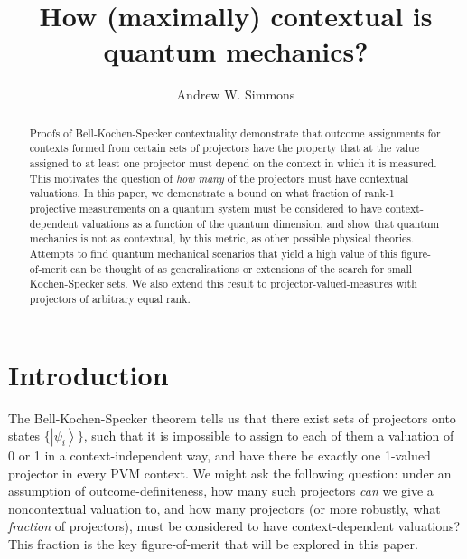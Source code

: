 \documentclass{amsart}
\theoremstyle{definition}
\newcommand{\ket}[1]{{\left\vert{#1}\right\rangle}}
\begin{document}
\title{How (maximally) contextual is quantum mechanics?}
\author{Andrew W. Simmons}
\address{Department of Physics, Imperial College London, SW7 2AZ.}
\begin{abstract}
Proofs of Bell-Kochen-Specker contextuality demonstrate that outcome assignments for contexts formed from certain sets of projectors have the property that at the value assigned to at least one projector must depend on the context in which it is measured. This motivates the question of \emph{how many} of the projectors must have contextual valuations. In this paper, we demonstrate a bound on what fraction of rank-1 projective measurements on a quantum system must be considered to have context-dependent valuations as a function of the quantum dimension, and show that quantum mechanics is not as contextual, by this metric, as other possible physical theories. Attempts to find quantum mechanical scenarios that yield a high value of this figure-of-merit can be thought of as generalisations or extensions of the search for small Kochen-Specker sets. We also extend this result to projector-valued-measures with projectors of arbitrary equal rank.
\end{abstract}
\maketitle
\section{Introduction}

The Bell-Kochen-Specker theorem tells us that there exist sets of projectors onto states $\{\ket{\psi_i}\}$, such that it is impossible to assign to each of them a valuation of 0 or 1 in a context-independent way, and have there be exactly one 1-valued projector in every PVM context. We might ask the following question: under an assumption of outcome-definiteness, how many such projectors \emph{can} we give a noncontextual valuation to, and how many projectors (or more robustly, what \emph{fraction} of projectors), must be considered to have context-dependent valuations? This fraction is the key figure-of-merit that will be explored in this paper.
\end{document}
